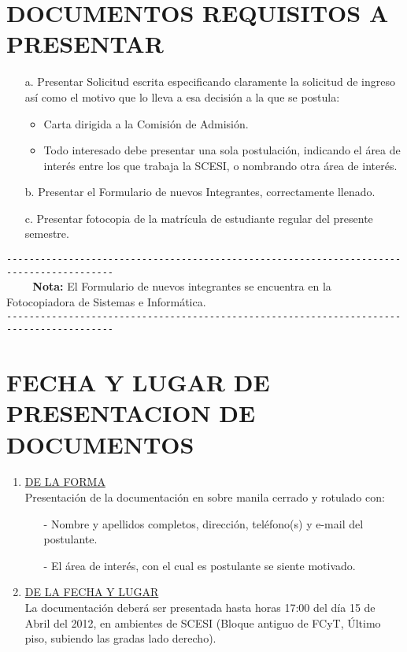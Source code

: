 \documentclass[11pt,letterpaper]{report}
\begin{document}
\section*{\bf \normalsize DOCUMENTOS REQUISITOS A PRESENTAR}
\begin{itemize}
\item[a.] Presentar Solicitud escrita especificando claramente la solicitud de ingreso así como el motivo que lo lleva a esa decisión a la que se postula:
\begin{itemize}
\item Carta dirigida a la Comisión de Admisión.
\item Todo interesado debe presentar una sola postulación, indicando el área de interés entre los que  trabaja la SCESI, o nombrando otra área de interés.
\end{itemize}
\item[b.] Presentar el Formulario de nuevos Integrantes, correctamente llenado.
\item[c.] Presentar fotocopia de la matrícula de estudiante regular del presente semestre.
\end{itemize}
\verb+-----------------------------------------------------------------------------------------+\\
\verb+    + {\bf Nota:} El Formulario de nuevos integrantes se encuentra en la Fotocopiadora de Sistemas e Informática.\\
\verb+-----------------------------------------------------------------------------------------+
\section*{\bf \normalsize FECHA Y LUGAR DE PRESENTACION DE DOCUMENTOS}
\begin{enumerate}
\item \underline{DE LA FORMA}\\
Presentación de la documentación en sobre manila cerrado y rotulado con:
\begin{itemize}
\item[-] Nombre y apellidos completos, dirección, teléfono(s) y e-mail del postulante.
\item[-] El área de interés, con el cual es postulante se siente motivado.
\end{itemize}
\item \underline{DE LA FECHA Y LUGAR}\\
La documentación deberá ser presentada hasta horas 17:00 del día 15 de Abril del 2012, en ambientes de SCESI (Bloque antiguo de FCyT, Último piso, subiendo las gradas lado derecho).
\end{enumerate}
\end{document}
